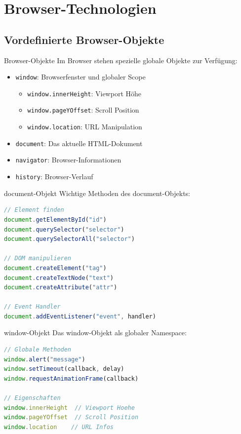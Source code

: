 \section{Browser-Technologien}

\subsection{Vordefinierte Browser-Objekte}

\begin{definition}{Browser-Objekte}
    Im Browser stehen spezielle globale Objekte zur Verfügung:
    \begin{itemize}
        \item \texttt{window}: Browserfenster und globaler Scope
            \begin{itemize}
                \item \texttt{window.innerHeight}: Viewport Höhe
                \item \texttt{window.pageYOffset}: Scroll Position
                \item \texttt{window.location}: URL Manipulation
            \end{itemize}
        \item \texttt{document}: Das aktuelle HTML-Dokument
        \item \texttt{navigator}: Browser-Informationen
        \item \texttt{history}: Browser-Verlauf
    \end{itemize}
\end{definition}

\begin{KR}{document-Objekt}
Wichtige Methoden des document-Objekts:
\begin{lstlisting}[language=JavaScript, style=basesmol]
// Element finden
document.getElementById("id")  
document.querySelector("selector") 
document.querySelectorAll("selector")

// DOM manipulieren
document.createElement("tag")    
document.createTextNode("text") 
document.createAttribute("attr")

// Event Handler
document.addEventListener("event", handler)
\end{lstlisting}
\end{KR}

\begin{KR}{window-Objekt}
Das window-Objekt als globaler Namespace:
\begin{lstlisting}[language=JavaScript, style=basesmol]
// Globale Methoden
window.alert("message")
window.setTimeout(callback, delay)
window.requestAnimationFrame(callback)

// Eigenschaften
window.innerHeight  // Viewport Hoehe
window.pageYOffset  // Scroll Position
window.location    // URL Infos
\end{lstlisting}
\end{KR}

